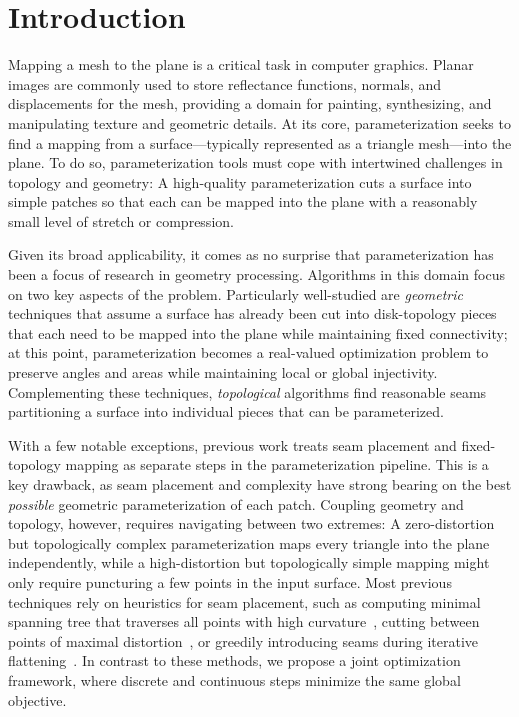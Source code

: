 
\section{Introduction}
Mapping a mesh to the plane is a critical task in computer graphics.  Planar images are commonly used to store reflectance functions, normals, and displacements
for the mesh, providing a domain for painting, synthesizing, and manipulating texture and geometric details. 
At its core, parameterization seeks to find a mapping from a surface---typically represented as a triangle mesh---into the plane.  To do so, parameterization tools must cope with intertwined challenges in topology and geometry:  A high-quality parameterization cuts a surface into simple %
patches so that each can be mapped into the plane with a reasonably small level of stretch or compression.

Given its broad applicability, it comes as no surprise that parameterization has been a focus of research in geometry processing.  Algorithms in this domain focus on two key aspects of the problem.  Particularly well-studied are \emph{geometric} techniques that assume a surface has already been cut into disk-topology pieces that each need to be mapped into the plane while maintaining fixed connectivity; at this point, parameterization becomes a real-valued optimization problem to preserve angles and areas while maintaining local or global injectivity. Complementing these techniques, \emph{topological} algorithms find reasonable seams partitioning a surface into individual pieces that can be parameterized.  

With a few notable exceptions, previous work treats seam placement and fixed-topology mapping as separate steps in the parameterization pipeline.  This is a key drawback, as seam placement and complexity have strong bearing on the best \emph{possible} geometric parameterization of each patch.  Coupling geometry and topology, however, requires navigating between two extremes:  A zero-distortion but topologically complex parameterization maps every triangle into the plane independently, while a high-distortion but topologically simple mapping might only require puncturing a few points in the input surface.
%
%
Most previous techniques rely on heuristics for seam placement, such as computing minimal spanning tree that traverses all points with high curvature~\cite{Sheffer2002Seamster}, cutting between points of maximal distortion~\cite{Gu2002Geometry}, or greedily introducing seams during iterative flattening~\cite{BoundedDistortParam:2002}. In contrast to these methods, we propose a joint optimization framework, where discrete and continuous steps minimize the same global objective. 

